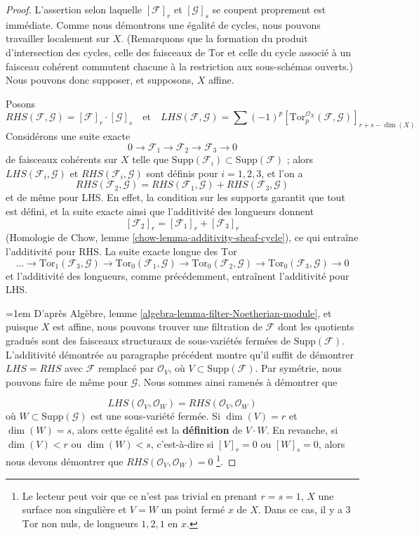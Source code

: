 \begin{proof}
L'assertion selon laquelle $[\mathcal{F}]_r$ et $[\mathcal{G}]_s$ se coupent proprement
est immédiate. Comme nous démontrons une égalité de cycles, nous pouvons travailler
localement sur $X$. (Remarquons que la formation du produit d'intersection
des cycles, celle des faisceaux de $\text{Tor}$ et
celle du cycle associé à un faisceau cohérent commutent chacune à la
restriction aux sous-schémas ouverts.) Nous pouvons donc supposer, et supposons, $X$ affine.

\medskip\noindent
Posons
$$
RHS(\mathcal{F}, \mathcal{G}) = [\mathcal{F}]_r \cdot [\mathcal{G}]_s
\quad\text{et}\quad
LHS(\mathcal{F}, \mathcal{G}) = \sum (-1)^p
[\text{Tor}_p^{\mathcal{O}_X}(\mathcal{F}, \mathcal{G})]_{r + s - \dim(X)}
$$
Considérons une suite exacte
$$
0 \to \mathcal{F}_1 \to \mathcal{F}_2 \to \mathcal{F}_3 \to 0
$$
de faisceaux cohérents sur $X$ telle que
$\text{Supp}(\mathcal{F}_i) \subset \text{Supp}(\mathcal{F})$ ;
alors $LHS(\mathcal{F}_i, \mathcal{G})$ et
$RHS(\mathcal{F}_i, \mathcal{G})$ sont définis pour $i = 1, 2, 3$,
et l'on a
$$
RHS(\mathcal{F}_2, \mathcal{G}) =
RHS(\mathcal{F}_1, \mathcal{G}) + RHS(\mathcal{F}_3, \mathcal{G})
$$
et de même pour LHS. En effet, la condition sur les supports garantit que
tout est défini, et la suite exacte ainsi que l'additivité des longueurs
donnent
$$
[\mathcal{F}_2]_r = [\mathcal{F}_1]_r  + [\mathcal{F}_3]_r
$$
(Homologie de Chow, lemme \ref{chow-lemma-additivity-sheaf-cycle}),
ce qui entraîne l'additivité pour RHS. La suite exacte longue des $\text{Tor}$
$$
\ldots \to \text{Tor}_1(\mathcal{F}_3, \mathcal{G}) \to
\text{Tor}_0(\mathcal{F}_1, \mathcal{G}) \to
\text{Tor}_0(\mathcal{F}_2, \mathcal{G}) \to
\text{Tor}_0(\mathcal{F}_3, \mathcal{G}) \to 0
$$
et l'additivité des longueurs, comme précédemment, entraînent l'additivité pour LHS.

\medskip\noindent
{\emergencystretch=1em D'après Algèbre, lemme \ref{algebra-lemma-filter-Noetherian-module},
et puisque $X$ est affine, nous pouvons trouver une filtration de $\mathcal{F}$
dont les quotients gradués sont des faisceaux structuraux de sous-variétés fermées de
$\text{Supp}(\mathcal{F})$. L'additivité démontrée au paragraphe précédent
montre qu'il suffit de démontrer $LHS = RHS$ avec
$\mathcal{F}$ remplacé par $\mathcal{O}_V$, où
$V \subset \text{Supp}(\mathcal{F})$.
Par symétrie, nous pouvons faire de même pour $\mathcal{G}$.
Nous sommes ainsi ramenés à démontrer que\par}
$$
LHS(\mathcal{O}_V, \mathcal{O}_W) = RHS(\mathcal{O}_V, \mathcal{O}_W)
$$
où $W \subset \text{Supp}(\mathcal{G})$ est une sous-variété fermée.
Si $\dim(V) = r$ et $\dim(W) = s$, alors cette égalité est la
{\bf définition} de $V \cdot W$. En revanche, si
$\dim(V) < r$ ou $\dim(W) < s$, c'est-à-dire si $[V]_r = 0$ ou $[W]_s = 0$,
alors nous devons démontrer que $RHS(\mathcal{O}_V, \mathcal{O}_W) = 0$
\footnote{Le lecteur peut voir que ce n'est pas trivial en
prenant $r = s = 1$, $X$ une surface non singulière et $V = W$
un point fermé $x$ de $X$. Dans ce cas, il y a $3$
$\text{Tor}$ non nuls, de longueurs $1, 2, 1$ en $x$.}.


\end{proof}
